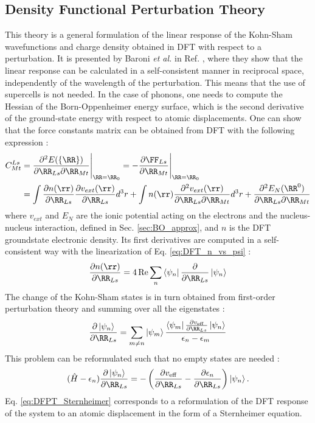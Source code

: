 \subsection{Density Functional Perturbation Theory} \label{sec:DFPT}
This theory is a general formulation of the linear response of the Kohn-Sham wavefunctions and charge density obtained in \acrshort{DFT} with respect to a perturbation. It is presented by Baroni \textit{et al.} in Ref. \cite{baroni2001phonons}, where they show that the linear response can be calculated in a self-consistent manner in reciprocal space, independently of the wavelength of the perturbation. This means that the use of supercells is not needed. In the case of phonons, one needs to compute the Hessian of the Born-Oppenheimer energy surface, which is the second derivative of the ground-state energy with respect to atomic displacements. One can show that the force constants matrix can be obtained from \acrshort{DFT} with the following expression \cite{gonze1997dynamical} :
\begin{align}
\begin{split}
	C^{Ls}_{Mt} &= \frac{\partial^2 E(\{\RR\})}{\partial\RR_{Ls} \partial \RR_{Mt}} \Biggr|_{\RR=\RR_0} = - \frac{\partial \FF_{Ls}}{\partial \RR_{Mt}} \Biggr|_{\RR=\RR_0} \\
	&= \int \frac{\partial n(\rr)}{\partial \RR_{Ls}} \frac{\partial v_{ext}(\rr)}{\partial \RR_{Ls}} d^3r + \int n(\rr) \frac{\partial^2 v_{ext}(\rr)}{\partial \RR_{Ls} \partial \RR_{Mt}} d^3r + \frac{\partial^2 E_N(\RR^0) }{\partial \RR_{Ls} \partial \RR_{Mt}}
\end{split}
\end{align}
where $v_{ext}$ and $E_N$ are the ionic potential acting on the electrons and the nucleus-nucleus interaction, defined in Sec. \ref{sec:BO_approx}, and $n$ is the \acrshort{DFT} groundstate electronic density. Its first derivatives are computed in a self-consistent way with the linearization of Eq. \eqref{eq:DFT_n_vs_psi} :
\begin{equation}
	\frac{\partial n(\rr)}{\partial \RR_{Ls}} = 4\Re \sum_n \bra{\psi_n} \frac{\partial}{\partial \RR_{Ls}} \ket{\psi_n}
\end{equation}
The change of the Kohn-Sham states is in turn obtained from first-order perturbation theory and summing over all the eigenstates :
\begin{equation}
	\frac{\partial\ket{\psi_n}}{\partial \RR_{Ls}} = \sum_{m\neq n} \ket{\psi_m} \frac{\bra{\psi_m} \tfrac{\partial v_{\text{eff}}}{\partial\RR_{Ls}}\ket{\psi_n}}{\epsilon_n - \epsilon_m}
\end{equation}
This problem can be reformulated such that no empty states are needed :
\begin{equation}
	(\hat{H} - \epsilon_n) \frac{\partial\ket{\psi_n}}{\partial \RR_{Ls}} = - \left(\frac{\partial v_{\text{eff}}}{\partial\RR_{Ls}} - \frac{\partial \epsilon_n}{\partial\RR_{Ls}}  \right) \ket{\psi_n}. \label{eq:DFPT_Sternheimer}
\end{equation}
Eq. \eqref{eq:DFPT_Sternheimer} corresponds to a reformulation of the \acrshort{DFT} response of the system to an atomic displacement in the form of a Sternheimer equation.\cite{sternheimer1954electronic}

